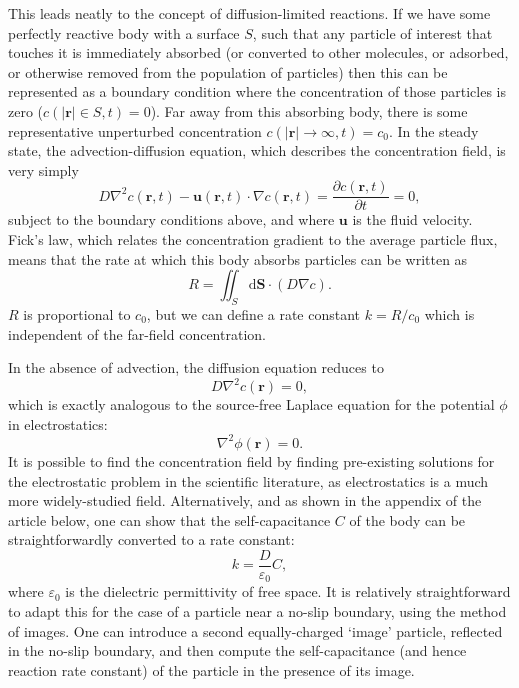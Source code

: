 This leads neatly to the concept of diffusion-limited reactions. If we have some perfectly reactive body with a surface $S$, such that any particle of interest that touches it is immediately absorbed (or converted to other molecules, or adsorbed, or otherwise removed from the population of particles) then this can be represented as a boundary condition where the concentration of those particles is zero ($c(\left|\mathbf{r}\right|\in S,t)=0$). Far away from this absorbing body, there is some representative unperturbed concentration $c(\left|\mathbf{r}\right|\rightarrow\infty,t)=c_0$. In the steady state, the advection-diffusion equation, which describes the concentration field, is very simply
\begin{equation}
    D \nabla^2 c(\mathbf{r},t) - \mathbf{u}(\mathbf{r},t)\cdot\nabla c(\mathbf{r},t) =  \frac{\partial c(\mathbf{r}, t)}{\partial t} = 0,
\end{equation}
subject to the boundary conditions above, and where $\mathbf{u}$ is the fluid velocity. Fick's law, which relates the concentration gradient to the average particle flux, means that the rate at which this body absorbs particles can be written as
\begin{equation}
    R = \iint_S \mathrm{d}\mathbf{S}\cdot (D\nabla c).
\end{equation}
$R$ is proportional to $c_0$, but we can define a rate constant $k=R/c_0$ which is independent of the far-field concentration.

In the absence of advection, the diffusion equation reduces to
\begin{equation}
    D\nabla^2 c(\mathbf{r}) = 0,
\end{equation}
which is exactly analogous to the source-free Laplace equation for the potential $\phi$ in electrostatics:
\begin{equation}
    \nabla^2 \phi(\mathbf{r}) = 0.
\end{equation}
It is possible to find the concentration field by finding pre-existing solutions for the electrostatic problem in the scientific literature, as electrostatics is a much more widely-studied field. Alternatively, and as shown in the appendix of the article below, one can show that the self-capacitance $C$ of the body can be straightforwardly converted to a rate constant:
\begin{equation}
    k = \frac{D}{\varepsilon_0} C,
\end{equation}
where $\varepsilon_0$ is the dielectric permittivity of free space.
It is relatively straightforward to adapt this for the case of a particle near a no-slip boundary, using the method of images. One can introduce a second equally-charged `image' particle, reflected in the no-slip boundary, and then compute the self-capacitance (and hence reaction rate constant) of the particle in the presence of its image.

